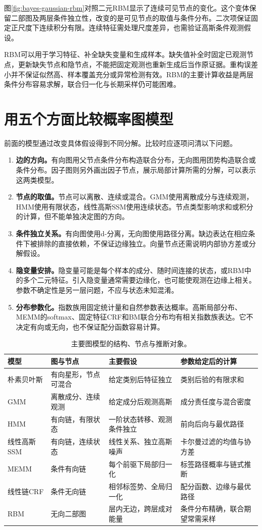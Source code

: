 图\ref{fig:bayes-gaussian-rbm}对照二元RBM显示了连续可见节点的变化。这个变体保留二部图及两层条件独立性，改变的是可见节点的取值与条件分布。二次项保证固定正尺度下连续积分有限。连续特征需处理尺度差异，也需验证高斯条件观测假设。

RBM可以用于学习特征、补全缺失变量和生成样本。缺失值补全时固定已观测节点，更新缺失节点和隐节点，不能把固定观测也重新生成后当作原证据。重构误差小并不保证似然高、样本覆盖充分或异常检测有效。RBM的主要计算收益是两层条件分布容易求解，联合归一化与长期采样仍可能困难。

\section{用五个方面比较概率图模型}
前面的模型通过改变具体假设得到不同分解。比较时应逐项问清以下问题。
\begin{enumerate}
 \item \textbf{边的方向。}有向图用父节点条件分布构造联合分布，无向图用团势构造联合或条件分布。因子图则另外画出因子节点，展示局部计算所需的分解，可以表示这两类模型。
 \item \textbf{节点的取值。}节点可以离散、连续或混合。GMM使用离散成分与连续观测，HMM使用有限状态，线性高斯SSM使用连续状态。节点类型影响求和或积分的计算，但不能单独决定图的方向。
 \item \textbf{条件独立关系。}有向图使用d-分离，无向图使用路径分离。缺边表达在相应条件下被排除的直接依赖，不保证边缘独立。向量节点还需说明内部协方差或分解假设。
 \item \textbf{隐变量安排。}隐变量可能是每个样本的成分、随时间连接的状态，或RBM中的多个二元特征。引入隐变量通常需要边缘化，也可能使观测在边缘上相关。参数不确定性是另一层问题，不应与状态未知混淆。
 \item \textbf{分布参数化。}指数族用固定统计量和自然参数表达概率。高斯局部分布、MEMM的softmax、固定特征CRF和BM联合分布均有相关指数族表达。它不决定有向或无向，也不保证配分函数容易计算。
\end{enumerate}

\begin{table}[htbp]
\centering
\caption{主要图模型的结构、节点与推断对象。}
\label{tab:bayes-model-assumptions}
\small
\begin{tabular}{p{2cm}p{2cm}p{4cm}p{4cm}}
\hline
模型 & 图与节点 & 主要假设 & 参数给定后的计算 \\
\hline
朴素贝叶斯 & 有向星形，节点可混合 & 给定类别后特征独立 & 类别后验的有限求和 \\
GMM & 离散成分、连续观测 & 给定成分后观测高斯 & 成分责任度与混合密度 \\
HMM & 有向链，有限状态 & 一阶状态转移、观测条件独立 & 前向后向与最优路径 \\
线性高斯SSM & 有向链，连续状态 & 线性关系、独立高斯噪声 & 卡尔曼过滤的均值与协方差 \\
MEMM & 条件有向链 & 每个前驱下局部归一化 & 标签路径概率与链式推断 \\
线性链CRF & 条件无向链 & 相邻标签势、全局归一化 & 配分函数、边缘与最优路径 \\
RBM & 无向二部图 & 层内无边，跨层成对能量 & 条件分布精确，联合期望常需采样 \\
\hline
\end{tabular}
\end{table}

